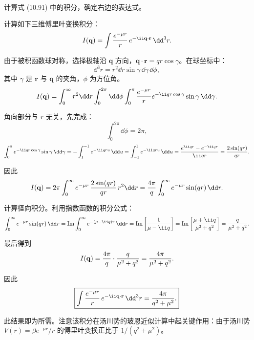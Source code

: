 \begin{question}
计算式 (10.91) 中的积分，确定右边的表达式。

\par\smallskip
{}

\end{question}
\begin{solution}
计算如下三维傅里叶变换积分：
\[
I(\mathbf q)=\int {e^{-\mu r}\over r}\,e^{-\ii\mathbf q\cdot\mathbf r}\,\dd^3r.
\]

由于被积函数球对称，选择极轴沿 $\mathbf q$ 方向，$\mathbf q\cdot\mathbf r=qr\cos\gamma$。在球坐标中：
\[
\dd^3r=r^2\dd r\sin\gamma\,\dd\gamma\,\dd\phi,
\]
其中 $\gamma$ 是 $\mathbf r$ 与 $\mathbf q$ 的夹角，$\phi$ 为方位角。
\[
I(\mathbf q)=\int_0^\infty r^2\dd r\int_0^{2\pi}\dd\phi\int_0^\pi {e^{-\mu r}\over r}e^{-\ii qr\cos\gamma}\sin\gamma\,\dd\gamma.
\]

角向部分与 $r$ 无关，先完成：
\[
\int_0^{2\pi}\dd\phi=2\pi,
\]
\[
\int_0^\pi e^{-\ii qr\cos\gamma}\sin\gamma\,\dd\gamma
=-\int_1^{-1}e^{-\ii qr u}\,\dd u
=\int_{-1}^{1}e^{-\ii qr u}\,\dd u
={e^{\ii qr}-e^{-\ii qr}\over\ii qr}={2\sin(qr)\over qr}.
\]

因此
\[
I(\mathbf q)=2\pi\int_0^\infty e^{-\mu r}\,{2\sin(qr)\over qr}\,r^2\dd r
={4\pi\over q}\int_0^\infty e^{-\mu r}\sin(qr)\,\dd r.
\]

计算径向积分。利用指数函数的积分公式：
\[
\int_0^\infty e^{-\mu r}\sin(qr)\,\dd r
=\operatorname{Im}\int_0^\infty e^{-(\mu-\ii q)r}\,\dd r
=\operatorname{Im}\left[{1\over\mu-\ii q}\right]
=\operatorname{Im}\left[{\mu+\ii q\over\mu^2+q^2}\right]
={q\over\mu^2+q^2}.
\]

最后得到
\[
I(\mathbf q)={4\pi\over q}\cdot{q\over\mu^2+q^2}
={4\pi\over\mu^2+q^2}.
\]

因此
\[
\boxed{\int {e^{-\mu r}\over r}\,e^{-\ii\mathbf q\cdot\mathbf r}\,\dd^3r={4\pi\over q^2+\mu^2}.}
\]

此结果即为所需。注意该积分在汤川势的玻恩近似计算中起关键作用：由于汤川势 $V(r)=\beta e^{-\mu r}/r$ 的傅里叶变换正比于 $1/(q^2+\mu^2)$。
\end{solution}

